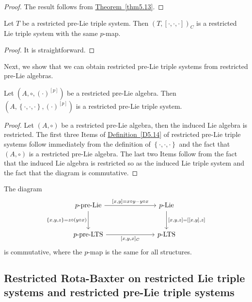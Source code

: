 \documentclass[11pt, twoside]{article}
\begin{document}
\begin{proof}
The result follows from \hyperref[thm5.13]{Theorem~\ref*{thm5.13}}.
\end{proof}

\begin{prop}
    Let $T$ be a restricted pre-Lie triple system. Then $(T,[\cdot,\cdot,\cdot])_C $ is a restricted Lie triple system with the same $p$-map. 
\end{prop}

\begin{proof}
    It is straightforward.
\end{proof}
Next, we show that we can obtain restricted pre-Lie triple systems from restricted pre-Lie algebras.
\begin{prop}
    Let $(A,\circ,(\cdot)^{[p]})$ be a restricted pre-Lie algebra. Then $(A,\left\{ \cdot,\cdot,\cdot\right\},(\cdot)^{[p]} )$ is a restricted pre-Lie triple system.
\end{prop}

\begin{proof}
    Let $(A,\circ) $ be a restricted pre-Lie algebra, then the induced Lie algebra is restricted. The first three Items of \hyperref[D5.14]{Definition~\ref*{D5.14}} of restricted pre-Lie triple systems follow immediately from  the definition of $\left\{ \cdot,\cdot,\cdot\right\} $ and the fact that $(A,\circ) $ is a restricted pre-Lie algebra. The last two Items follow from the fact that the induced Lie algebra is restricted so as the induced Lie triple system and the fact that the diagram is commutative.
\end{proof}

The diagram \[\begin{tikzcd}[row sep=large, column sep=large]
	{ \text{$p$-pre-Lie}} && \text{$p$-Lie} \\
	{\text{$p$-pre-LTS}} && \text{$p$-LTS}
	\arrow["{[x,y]=x\circ y - y\circ x}", from=1-1, to=1-3]
	\arrow["{\left\{ x,y,z\right\}= z\circ (y\circ x)}"', from=1-1, to=2-1]
	\arrow["{[x,y,z]=[[x,y],z]}", from=1-3, to=2-3]
	\arrow["{[x,y,x]_C}"', from=2-1, to=2-3]
\end{tikzcd}\] is commutative, where the $p$-map is the same for all structures.



\subsection{Restricted Rota-Baxter on restricted Lie triple systems and   restricted pre-Lie triple systems}
\end{document}
